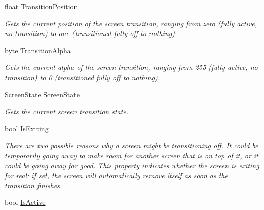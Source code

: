 \begin{DoxyCompactItemize}
float \hyperlink{classCityMania_1_1GameScreen_ad26489543c8a249c65182b77a5f8c68f}{TransitionPosition}
\begin{DoxyCompactList}\small\item\em Gets the current position of the screen transition, ranging from zero (fully active, no transition) to one (transitioned fully off to nothing). \item\end{DoxyCompactList}\item 
byte \hyperlink{classCityMania_1_1GameScreen_ac874b0c2bc737aba6a017e24fa564d74}{TransitionAlpha}
\begin{DoxyCompactList}\small\item\em Gets the current alpha of the screen transition, ranging from 255 (fully active, no transition) to 0 (transitioned fully off to nothing). \item\end{DoxyCompactList}\item 
ScreenState \hyperlink{classCityMania_1_1GameScreen_af7771d5fc80b7cf95ad3aa1ac74b54f5}{ScreenState}
\begin{DoxyCompactList}\small\item\em Gets the current screen transition state. \item\end{DoxyCompactList}\item 
bool \hyperlink{classCityMania_1_1GameScreen_a6e36c40cbf1c0b0cd6d0c8599269c8f0}{IsExiting}
\begin{DoxyCompactList}\small\item\em There are two possible reasons why a screen might be transitioning off. It could be temporarily going away to make room for another screen that is on top of it, or it could be going away for good. This property indicates whether the screen is exiting for real: if set, the screen will automatically remove itself as soon as the transition finishes. \item\end{DoxyCompactList}\item 
bool \hyperlink{classCityMania_1_1GameScreen_a50204f4b2c99f890598285395bfeda02}{IsActive}

\end{DoxyCompactItemize}
